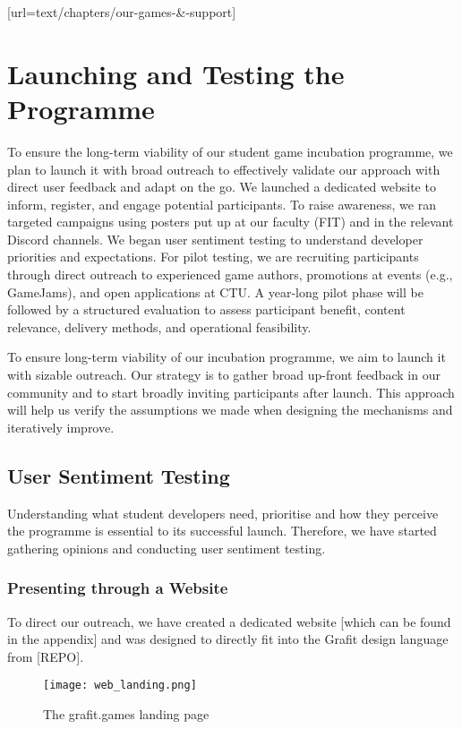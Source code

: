 [url=text/chapters/our-games-&-support]
\chapter{Launching and Testing the Programme}\label{chap:launch-testing}

\begin{chapterabstract}
	To ensure the long-term viability of our student game incubation programme, we plan to launch it with broad outreach to effectively validate our approach with direct user feedback and adapt on the go. We launched a dedicated website to inform, register, and engage potential participants. To raise awareness, we ran targeted campaigns using posters put up at our faculty (FIT) and in the relevant Discord channels. We began user sentiment testing to understand developer priorities and expectations. For pilot testing, we are recruiting participants through direct outreach to experienced game authors, promotions at events (e.g., GameJams), and open applications at CTU. A year-long pilot phase will be followed by a structured evaluation to assess participant benefit, content relevance, delivery methods, and operational feasibility.
\end{chapterabstract}

To ensure long-term viability of our incubation programme, we aim to launch it with sizable outreach. Our strategy is to gather broad up-front feedback in our community and to start broadly inviting participants after launch. This approach will help us verify the assumptions we made when designing the mechanisms and iteratively improve.

\section{User Sentiment Testing}
Understanding what student developers need, prioritise and how they perceive the programme is essential to its successful launch. Therefore, we have started gathering opinions and conducting user sentiment testing.

\subsection{Presenting through a Website}
To direct our outreach, we have created a dedicated website [which can be found in the appendix] and was designed to directly fit into the Grafit design language from [REPO].
\begin{figure}[H]
    \texttt{[image: web\_landing.png]}
    \caption{The grafit.games landing page}
    \label{fig:web_landing}
\end{figure}


